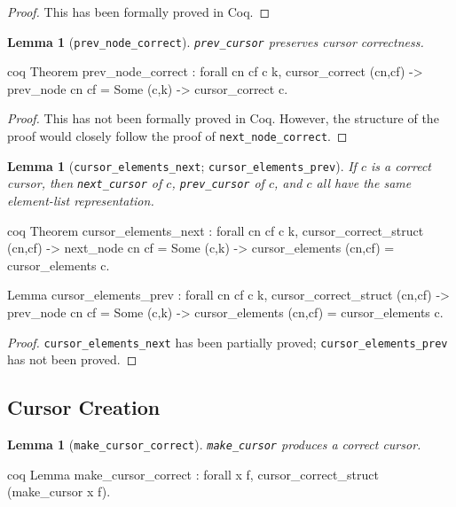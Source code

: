 \documentclass[12pt]{article}
\newtheorem{lemma}[theorem]{Lemma}
\newcommand{\nocontentsline}[3]{}
\newcommand{\tocless}[2]{\bgroup\let\addcontentsline=\nocontentsline#1{#2}\egroup}
\begin{document}
\begin{appendices}
\begin{singlespace}
\begin{proof}
This has been formally proved in Coq.
\end{proof}

\begin{lemma}[\texttt{prev\_node\_correct}]
\texttt{prev\_cursor} preserves cursor correctness.
\end{lemma}

\begin{cminted}{coq}
Theorem prev_node_correct : forall cn cf c k,
  cursor_correct (cn,cf) -> prev_node cn cf = Some (c,k) ->
  cursor_correct c.
\end{cminted}

\begin{proof}
This has not been formally proved in Coq. However, the structure of the proof would closely follow the proof of \texttt{next\_node\_correct}.
\end{proof}

\begin{lemma}[\texttt{cursor\_elements\_next}; \texttt{cursor\_elements\_prev}]
If $c$ is a correct cursor, then \texttt{next\_cursor} of $c$, \texttt{prev\_cursor} of $c$, and $c$ all have the same element-list representation.
\end{lemma}

\begin{cminted}{coq}
Theorem cursor_elements_next : forall cn cf c k,
  cursor_correct_struct (cn,cf) ->
  next_node cn cf = Some (c,k) ->
  cursor_elements (cn,cf) = cursor_elements c.
  
Lemma cursor_elements_prev : forall cn cf c k,
  cursor_correct_struct (cn,cf) ->
  prev_node cn cf = Some (c,k) ->
  cursor_elements (cn,cf) = cursor_elements c.
\end{cminted}

\begin{proof}
\texttt{cursor\_elements\_next} has been partially proved; \texttt{cursor\_elements\_prev} has not been proved.
\end{proof}

\tocless\subsection{Cursor Creation}

\begin{lemma}[\texttt{make\_cursor\_correct}]
\texttt{make\_cursor} produces a correct cursor.
\end{lemma}

\begin{cminted}{coq}
Lemma make_cursor_correct : forall x f,
  cursor_correct_struct (make_cursor x f).
\end{cminted}


\end{singlespace}
\end{appendices}
\end{document}
